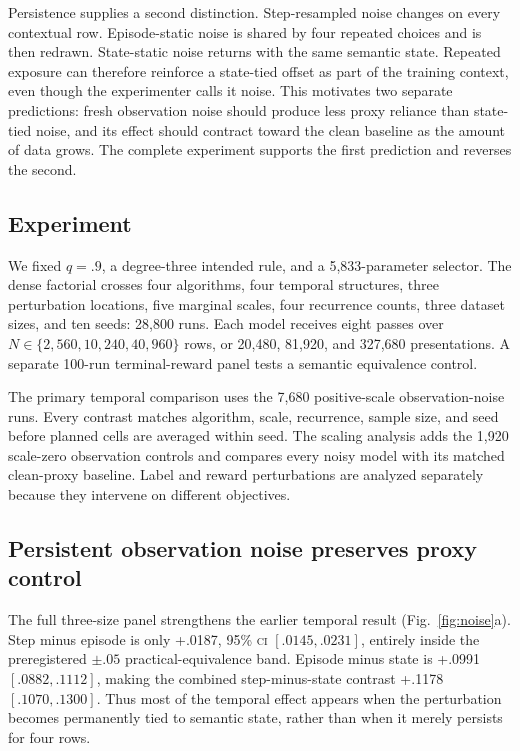 \documentclass[11pt,a4paper]{article}
\newcommand{\CI}{\textsc{ci}}
\newcommand{\fig}[1]{Fig.~\ref{#1}}
\begin{document}
Persistence supplies a second distinction. Step-resampled noise changes on every contextual row. Episode-static noise is shared by four repeated choices and is then redrawn. State-static noise returns with the same semantic state. Repeated exposure can therefore reinforce a state-tied offset as part of the training context, even though the experimenter calls it noise. This motivates two separate predictions: fresh observation noise should produce less proxy reliance than state-tied noise, and its effect should contract toward the clean baseline as the amount of data grows. The complete experiment supports the first prediction and reverses the second.

\subsection*{Experiment}

We fixed $q=.9$, a degree-three intended rule, and a 5,833-parameter selector. The dense factorial crosses four algorithms, four temporal structures, three perturbation locations, five marginal scales, four recurrence counts, three dataset sizes, and ten seeds: 28,800 runs. Each model receives eight passes over $N\in\{2{,}560,10{,}240,40{,}960\}$ rows, or 20,480, 81,920, and 327,680 presentations. A separate 100-run terminal-reward panel tests a semantic equivalence control.

The primary temporal comparison uses the 7,680 positive-scale observation-noise runs. Every contrast matches algorithm, scale, recurrence, sample size, and seed before planned cells are averaged within seed. The scaling analysis adds the 1,920 scale-zero observation controls and compares every noisy model with its matched clean-proxy baseline. Label and reward perturbations are analyzed separately because they intervene on different objectives.

\subsection*{Persistent observation noise preserves proxy control}

The full three-size panel strengthens the earlier temporal result (\fig{fig:noise}a). Step minus episode is only +.0187, 95\% \CI{} $[.0145,.0231]$, entirely inside the preregistered $\pm.05$ practical-equivalence band. Episode minus state is +.0991 $[.0882,.1112]$, making the combined step-minus-state contrast +.1178 $[.1070,.1300]$. Thus most of the temporal effect appears when the perturbation becomes permanently tied to semantic state, rather than when it merely persists for four rows.
\end{document}
